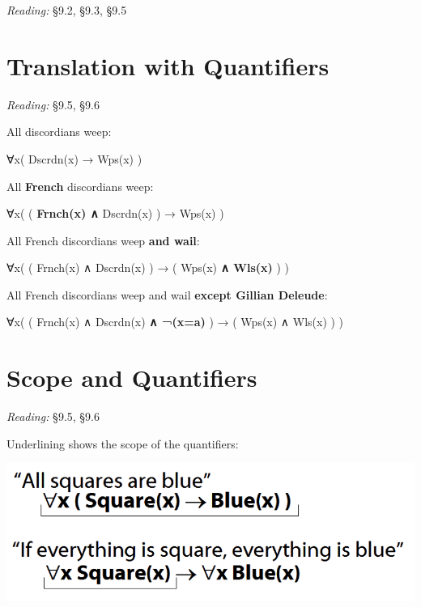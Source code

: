 \documentclass[12pt]{extarticle}
\begin{document}
\begin{multicols*}{3}
\emph{Reading:} §9.2, §9.3, §9.5
 
 
 
\section{Translation with Quantifiers}
 
\emph{Reading:} §9.5, §9.6
 
\begin{minipage}{\columnwidth}
 
All discordians weep:
 
∀x( Dscrdn(x) → Wps(x) )
 
\end{minipage}
 
\begin{minipage}{\columnwidth}
 
All \textbf{French} discordians weep:
 
∀x( ( \textbf{Frnch(x) ∧} Dscrdn(x) ) → Wps(x) )
 
\end{minipage}
 
\begin{minipage}{\columnwidth}
 
All French discordians weep \textbf{and wail}:
 
∀x( ( Frnch(x) ∧ Dscrdn(x) ) → ( Wps(x) \textbf{ ∧ Wls(x)} ) )
 
\end{minipage}
 
\begin{minipage}{\columnwidth}
 
All French discordians weep and wail \textbf{except Gillian Deleude}:
 
∀x( ( Frnch(x) ∧ Dscrdn(x) \textbf{∧ ¬(x=a)} ) → ( Wps(x) ∧ Wls(x) ) )
 
\end{minipage}
 
 
 
\section{Scope and Quantifiers}
 
\emph{Reading:} §9.5, §9.6
 
\begin{minipage}{\columnwidth}
 
Underlining shows the scope of the quantifiers:
 
\begin{center}
\includegraphics[scale=0.3]{img/scope_quantifiers.png}
\end{center}
\end{minipage}
 

\end{multicols*}
\end{document}
